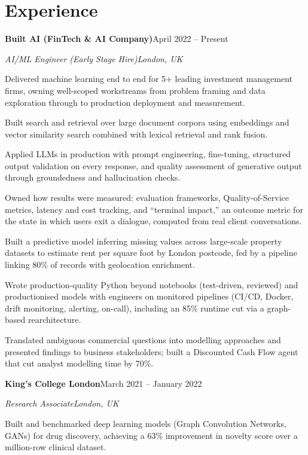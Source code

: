 \documentclass[10pt,a4paper]{article}
\newcommand{\entry}[4]{%
  {\color{company}\bfseries #1}\hfill {\color{muted}#2}\par
  \vspace{1pt}
  {\itshape #3}\hfill {\color{muted}\itshape #4}\par
  \vspace{3pt}%
}
\begin{document}
\section{Experience}
\entry{Built AI (FinTech \& AI Company)}{April 2022 -- Present}{AI/ML Engineer (Early Stage Hire)}{London, UK}
\begin{tight}
  \item Delivered machine learning end to end for 5+ leading investment management firms, owning well-scoped workstreams from problem framing and data exploration through to production deployment and measurement.
  \item Built search and retrieval over large document corpora using embeddings and vector similarity search combined with lexical retrieval and rank fusion.
  \item Applied LLMs in production with prompt engineering, fine-tuning, structured output validation on every response, and quality assessment of generative output through groundedness and hallucination checks.
  \item Owned how results were measured: evaluation frameworks, Quality-of-Service metrics, latency and cost tracking, and ``terminal impact,'' an outcome metric for the state in which users exit a dialogue, computed from real client conversations.
  \item Built a predictive model inferring missing values across large-scale property datasets to estimate rent per square foot by London postcode, fed by a pipeline linking 80\% of records with geolocation enrichment.
  \item Wrote production-quality Python beyond notebooks (test-driven, reviewed) and productionised models with engineers on monitored pipelines (CI/CD, Docker, drift monitoring, alerting, on-call), including an 85\% runtime cut via a graph-based rearchitecture.
  \item Translated ambiguous commercial questions into modelling approaches and presented findings to business stakeholders; built a Discounted Cash Flow agent that cut analyst modelling time by 70\%.
\end{tight}

\entry{King's College London}{March 2021 -- January 2022}{Research Associate}{London, UK}
\begin{tight}
  \item Built and benchmarked deep learning models (Graph Convolution Networks, GANs) for drug discovery, achieving a 63\% improvement in novelty score over a million-row clinical dataset.
\end{tight}
\end{document}
